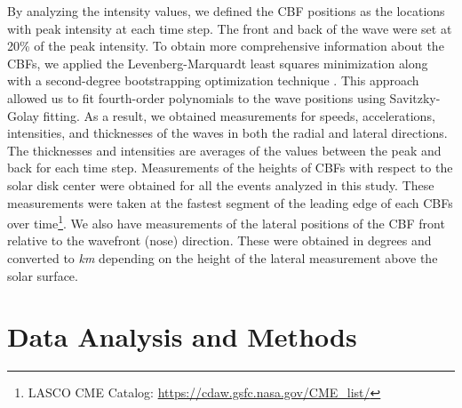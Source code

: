 By analyzing the intensity values, we defined the CBF positions as the locations with peak intensity at each time step. The front and back of the wave were set at 20\% of the peak intensity.
To obtain more comprehensive information about the CBFs, we applied the Levenberg-Marquardt least squares minimization \citep{markwardt_2009} along with a second-degree bootstrapping optimization technique \citep{efron_1979}. This approach allowed us to fit fourth-order polynomials to the wave positions using Savitzky-Golay fitting. As a result, we obtained measurements for speeds, accelerations, intensities, and thicknesses of the waves in both the radial and lateral directions. The thicknesses and intensities are averages of the values between the peak and back for each time step. Measurements of the heights of CBFs with respect to the solar disk center were obtained for all the events analyzed in this study. These measurements were taken at the fastest segment of the leading edge of each CBFs over time\footnote{LASCO CME Catalog: \url{https://cdaw.gsfc.nasa.gov/CME_list/}}.
We also have measurements of the lateral positions of the CBF front relative to the wavefront (nose) direction. These were obtained in degrees and converted to \textit{km} depending on the height of the lateral measurement above the solar surface.

\section{Data Analysis and Methods}


